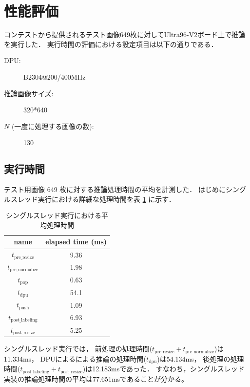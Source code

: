 \section{性能評価}
コンテストから提供されるテスト画像649枚に対してUltra96-V2ボード上で推論を実行した．
実行時間の評価における設定項目は以下の通りである．
\begin{description}
  \item[DPU:] B2304@200/400MHz
  \item[推論画像サイズ:] 320*640
  \item[$N$ (一度に処理する画像の数):] 130
\end{description}
\subsection{実行時間}
テスト用画像 649 枚に対する推論処理時間の平均を計測した．
はじめにシングルスレッド実行における詳細な処理時間を表 \ref{tbl:time-singlethread} に示す．

\begin{table}[h]
  \caption{シングルスレッド実行における平均処理時間} \vspace{1mm}
  \label{tbl:time-singlethread}
  \begin{center}
    \begin{tabular}{cc}
      name & elapsed time (ms) \\ \hline
      $t_{\mathrm{pre\_resize}}$    & 9.36 \\ \hline
      $t_{\mathrm{pre\_normalize}}$ & 1.98 \\ \hline
      $t_{\mathrm{pop}}$            & 0.63 \\ \hline
      $t_{\mathrm{dpu}}$            & 54.1 \\ \hline
      $t_{\mathrm{push}}$           & 1.09 \\ \hline
      $t_{\mathrm{post\_labeling}}$ & 6.93 \\ \hline
      $t_{\mathrm{post\_resize}}$   & 5.25 \\ \hline
    \end{tabular}
  \end{center}
\end{table}

シングルスレッド実行では，
前処理の処理時間($t_{\mathrm{pre\_resize}} + t_{\mathrm{pre\_normalize}}$)は11.334ms，
DPUによるによる推論の処理時間($t_{\mathrm{dpu}}$)は54.134ms，
後処理の処理時間($t_{\mathrm{post\_labeling}} + t_{\mathrm{post\_resize}}$)は12.183msであった．
すなわち，シングルスレッド実装の推論処理時間の平均は77.651msであることが分かる。

